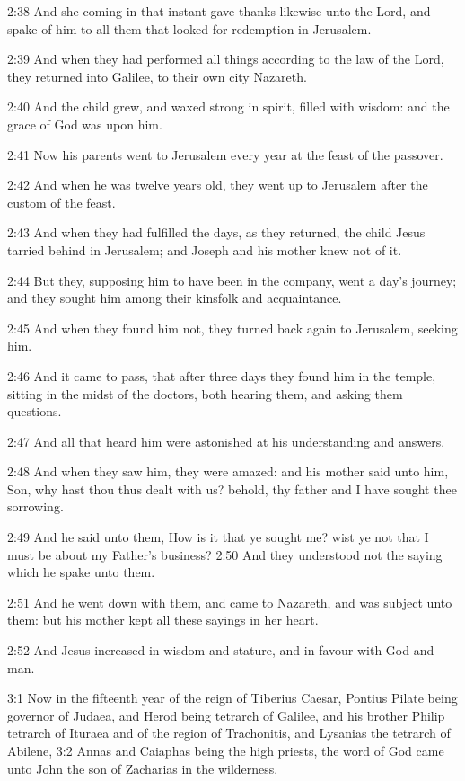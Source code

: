 2:38 And she coming in that instant gave thanks likewise unto the
Lord, and spake of him to all them that looked for redemption in
Jerusalem.

2:39 And when they had performed all things according to the law of
the Lord, they returned into Galilee, to their own city Nazareth.

2:40 And the child grew, and waxed strong in spirit, filled with
wisdom: and the grace of God was upon him.

2:41 Now his parents went to Jerusalem every year at the feast of the
passover.

2:42 And when he was twelve years old, they went up to Jerusalem after
the custom of the feast.

2:43 And when they had fulfilled the days, as they returned, the child
Jesus tarried behind in Jerusalem; and Joseph and his mother knew not
of it.

2:44 But they, supposing him to have been in the company, went a day's
journey; and they sought him among their kinsfolk and acquaintance.

2:45 And when they found him not, they turned back again to Jerusalem,
seeking him.

2:46 And it came to pass, that after three days they found him in the
temple, sitting in the midst of the doctors, both hearing them, and
asking them questions.

2:47 And all that heard him were astonished at his understanding and
answers.

2:48 And when they saw him, they were amazed: and his mother said unto
him, Son, why hast thou thus dealt with us? behold, thy father and I
have sought thee sorrowing.

2:49 And he said unto them, How is it that ye sought me? wist ye not
that I must be about my Father's business?  2:50 And they understood
not the saying which he spake unto them.

2:51 And he went down with them, and came to Nazareth, and was subject
unto them: but his mother kept all these sayings in her heart.

2:52 And Jesus increased in wisdom and stature, and in favour with God
and man.

3:1 Now in the fifteenth year of the reign of Tiberius Caesar, Pontius
Pilate being governor of Judaea, and Herod being tetrarch of Galilee,
and his brother Philip tetrarch of Ituraea and of the region of
Trachonitis, and Lysanias the tetrarch of Abilene, 3:2 Annas and
Caiaphas being the high priests, the word of God came unto John the
son of Zacharias in the wilderness.

